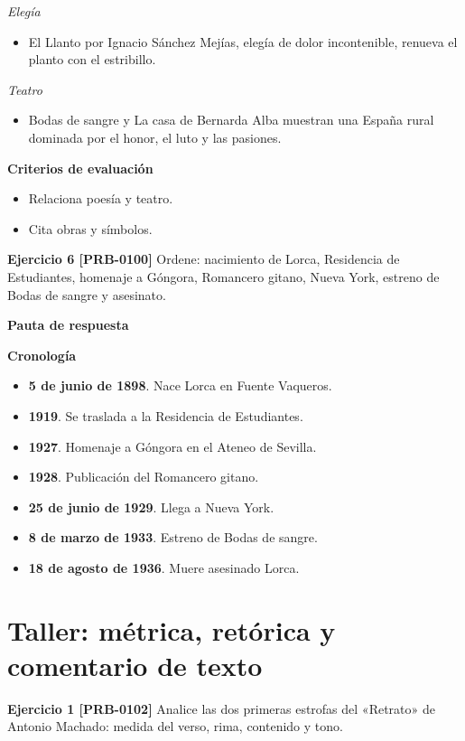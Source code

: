 \documentclass{book}
\begin{document}
\noindent\textit{Elegía}
\begin{itemize}
\item El Llanto por Ignacio Sánchez Mejías, elegía de dolor incontenible, renueva el planto con el estribillo.
\end{itemize}

\noindent\textit{Teatro}
\begin{itemize}
\item Bodas de sangre y La casa de Bernarda Alba muestran una España rural dominada por el honor, el luto y las pasiones.
\end{itemize}

\noindent\textbf{Criterios de evaluación}
\begin{itemize}
\item Relaciona poesía y teatro.
\item Cita obras y símbolos.
\end{itemize}

\noindent\textbf{Ejercicio 6 [PRB-0100]}
Ordene: nacimiento de Lorca, Residencia de Estudiantes, homenaje a Góngora, Romancero gitano, Nueva York, estreno de Bodas de sangre y asesinato.


\noindent\textbf{Pauta de respuesta}

\noindent\textbf{Cronología}
\begin{itemize}
\item \textbf{5 de junio de 1898}. Nace Lorca en Fuente Vaqueros.
\item \textbf{1919}. Se traslada a la Residencia de Estudiantes.
\item \textbf{1927}. Homenaje a Góngora en el Ateneo de Sevilla.
\item \textbf{1928}. Publicación del Romancero gitano.
\item \textbf{25 de junio de 1929}. Llega a Nueva York.
\item \textbf{8 de marzo de 1933}. Estreno de Bodas de sangre.
\item \textbf{18 de agosto de 1936}. Muere asesinado Lorca.
\end{itemize}

\section{Taller: métrica, retórica y comentario de texto}

\noindent\textbf{Ejercicio 1 [PRB-0102]}
Analice las dos primeras estrofas del «Retrato» de Antonio Machado: medida del verso, rima, contenido y tono.
\end{document}
